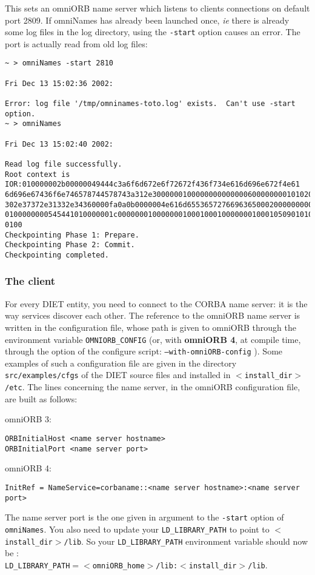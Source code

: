 This sets an omniORB name server which listens to clients
connections on default port 2809. If omniNames has already been launched once,
\emph{ie} there is already some log files in the log directory, using the
\texttt{-start} option causes an error. The port is actually read from old
log files:
{\footnotesize
\begin{verbatim}
~ > omniNames -start 2810

Fri Dec 13 15:02:36 2002:

Error: log file '/tmp/omninames-toto.log' exists.  Can't use -start option.
~ > omniNames  

Fri Dec 13 15:02:40 2002:

Read log file successfully.
Root context is IOR:010000002b00000049444c3a6f6d672e6f72672f436f734e616d696e672f4e61
6d696e67436f6e746578744578743a312e300000010000000000000060000000010102000d0000003134
302e37372e31332e34360000fa0a0b0000004e616d655365727669636500020000000000000008000000
0100000000545441010000001c0000000100000001000100010000000100010509010100010000000901
0100
Checkpointing Phase 1: Prepare.
Checkpointing Phase 2: Commit.
Checkpointing completed.
\end{verbatim}
}


\subsubsection{The client}

For every DIET entity, you need to connect to the CORBA name server: it is
the way services discover each other. The reference to the omniORB
name server is written in the configuration file, whose path is given
to omniORB through the environment variable \texttt{OMNIORB\_CONFIG}
(or, with \textbf{omniORB 4}, at compile time, through the option of
the configure script: \texttt{--with-omniORB-config} ). Some examples
of such a configuration file are given in the directory
\texttt{src/examples/cfgs} of the DIET source files and installed in
\texttt{$<$install\_dir$>$/etc}. The lines concerning the name server,
in the omniORB configuration file, are built as follows:
\begin{description}
 \item{omniORB 3:}
{\footnotesize
\begin{verbatim}
ORBInitialHost <name server hostname>
ORBInitialPort <name server port>
\end{verbatim}
}
 \item{omniORB 4:}
{\footnotesize
\begin{verbatim}
InitRef = NameService=corbaname::<name server hostname>:<name server port>
\end{verbatim}
}
The name server port is the one given in argument to the \texttt{-start} option
of \texttt{omniNames}.
You also need to update your \texttt{LD\_LIBRARY\_PATH} to point to \texttt{$<$install\_dir$>$/lib}.
So your \texttt{LD\_LIBRARY\_PATH} environment variable should now be :\\
\texttt{LD\_LIBRARY\_PATH$= <$omniORB\_home$>$/lib:$<$install\_dir$>$/lib}.

\end{description}

